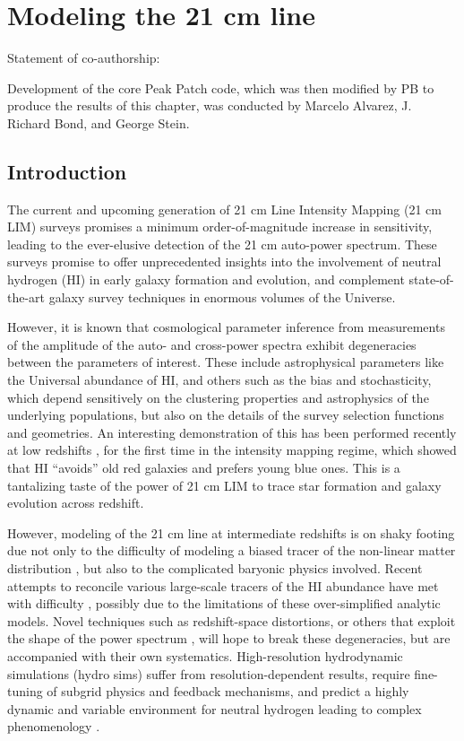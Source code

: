 \chapter{\label{chap:signal} Modeling the 21 cm line}


\noindent Statement of co-authorship:

\noindent Development of the core Peak Patch code, which was then modified by PB to produce the results of this chapter, was conducted by Marcelo Alvarez, J. Richard Bond, and George Stein.

\newpage

\section{Introduction}
\label{ch:signal:sec:intro}

The current and upcoming generation of 21 cm Line Intensity Mapping (21 cm LIM) surveys promises a minimum order-of-magnitude increase in sensitivity, leading to the ever-elusive detection of the 21 cm auto-power spectrum. These surveys promise to offer unprecedented insights into the involvement of neutral hydrogen (HI) in early galaxy formation and evolution, and complement state-of-the-art galaxy survey techniques in enormous volumes of the Universe.

However, it is known that cosmological parameter inference from measurements of the amplitude of the auto- and cross-power spectra exhibit degeneracies between the parameters of interest. These include astrophysical parameters like the Universal abundance of HI, and others such as the bias and stochasticity, which depend sensitively on the clustering properties and astrophysics of the underlying populations, but also on the details of the survey selection functions and geometries. An interesting demonstration of this has been performed recently at low redshifts \citep{andersonetalparkes}, for the first time in the intensity mapping regime, which showed that HI ``avoids'' old red galaxies and prefers young blue ones. This is a tantalizing taste of the power of 21 cm LIM to trace star formation and galaxy evolution across redshift.

However, modeling of the 21 cm line at intermediate redshifts is on shaky footing due not only to the difficulty of modeling a biased tracer of the non-linear matter distribution \citep{biasreview}, but also to the complicated baryonic physics involved. Recent attempts to reconcile various large-scale tracers of the HI abundance have met with difficulty \citep{pad2015, castorina2016}, possibly due to the limitations of these over-simplified analytic models. Novel techniques such as redshift-space distortions, or others that exploit the shape of the power spectrum \citep{wolz2017}, will hope to break these degeneracies, but are accompanied with their own systematics. High-resolution hydrodynamic simulations (hydro sims) suffer from resolution-dependent results, require fine-tuning of subgrid physics and feedback mechanisms, and predict a highly dynamic and variable environment for neutral hydrogen \cite{firehi} leading to complex phenomenology \citep{illustristng21cm}.

